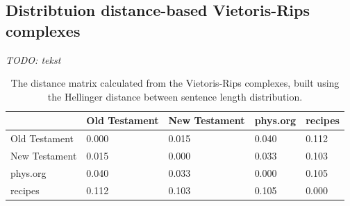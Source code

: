 \documentclass[12pt,a4paper]{amsart}
\begin{document}
\subsection{Distribtuion distance-based Vietoris-Rips complexes}

\emph{TODO: tekst}

\begin{table}
  \centering
  \begin{tabular}{l|llll}
                  & Old Testament & New Testament & phys.org & recipes \\ \hline
    Old Testament & 0.000 & 0.015 & 0.040 & 0.112 \\
    New Testament & 0.015 & 0.000 & 0.033 & 0.103 \\
    phys.org      & 0.040 & 0.033 & 0.000 & 0.105 \\
    recipes       & 0.112 & 0.103 & 0.105 & 0.000 \\
  \end{tabular}

  \caption{The distance matrix calculated from the Vietoris-Rips complexes,
    built using the Hellinger distance between sentence length distribution.}
  \label{tab:hell}
\end{table}
\end{document}
